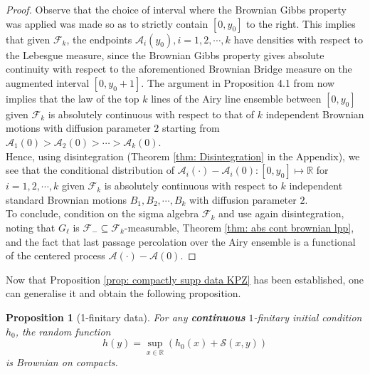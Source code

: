 \documentclass[12pt]{report}
\theoremstyle{plain}
\newtheorem{prop}[section]{Proposition}
\newcommand{\R}{\ensuremath{\mathbb{R}}}
\begin{document}
\begin{proof}[Proof]
Observe that the choice of interval where the Brownian Gibbs property was applied was made so as to strictly contain $[0,y_0]$ to the right. This implies that given $\mathcal{F}_k$, the endpoints $\mathcal{A}_i(y_0), i = 1,2,\cdots, k$ have densities with respect to the Lebesgue measure, since the Brownian Gibbs property gives absolute continuity with respect to the aforementioned Brownian Bridge measure on the augmented interval $[0,y_0+1]$. The argument in Proposition 4.1 from \cite{corwin2014brownian} now implies that the law of the top $k$ lines of the Airy line ensemble between $[0,y_0]$ given $\mathcal{F}_k$ is absolutely continuous with respect to that of $k$ independent Brownian motions with diffusion parameter $2$ starting from $\mathcal{A}_1(0)>\mathcal{A}_2(0)>\cdots >\mathcal{A}_k(0)$.\\

Hence, using disintegration (Theorem \ref{thm: Disintegration} in the Appendix), we see that the conditional distribution of $\mathcal{A}_i(\cdot)-\mathcal{A}_i(0):[0,y_0]\mapsto\R$ for $i=1,2,\cdots,k$ given $\mathcal{F}_k$ is absolutely continuous with respect to $k$ independent standard Brownian motions $B_1,B_2,\cdots, B_k$ with diffusion parameter $2$.\\

To conclude, condition on the sigma algebra $\mathcal{F}_k$ and use again disintegration, noting that $G_\ell$ is $\mathcal{F}_{-}\subseteq\mathcal{F}_k$-measurable, Theorem \ref{thm: abs cont brownian lpp}, and the fact that last passage percolation over the Airy ensemble is a functional of the centered process $\mathcal{A}(\cdot)-\mathcal{A}(0)$.

\end{proof}

Now that Proposition \ref{prop: compactly supp data KPZ} has been established, one can generalise it and obtain the following proposition.
\begin{prop}[1-finitary data]\label{prop: Brownian 1-finitary}For any \textbf{continuous} $1$-finitary initial condition $h_0$, the random function 
\[
h(y) = \sup_{x\in\R}(h_0(x)+\mathcal{S}(x,y))
\]
is Brownian on compacts.
\end{prop}
\end{document}
